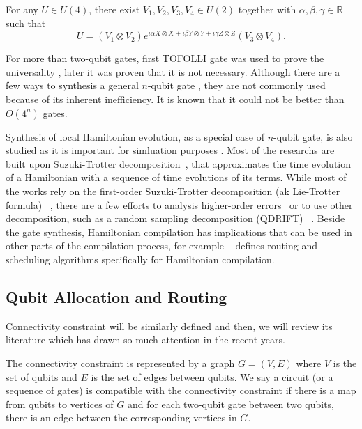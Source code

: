 \begin{lemma}\label{lem:kak_decomposition}
For any $U \in U(4)$, there exist $V_1, V_2, V_3, V_4 \in U(2)$ together with $\alpha, \beta, \gamma \in \mathbb{R}$ such that
\begin{equation}
  U = (V_1 \otimes V_2) e^{i\alpha X\otimes X + i\beta Y\otimes Y + i\gamma Z\otimes Z} (V_3 \otimes V_4).
  \end{equation}
\end{lemma}

For more than two-qubit gates, first TOFOLLI gate was used to prove the universality \cite{barenco1995}, later it was proven that it is not necessary. Although there are a few ways to synthesis a general $n$-qubit gate  \cite{sousa2006,shende2006}, they are not commonly used because of its inherent inefficiency. It is known that it could not be better than $O(4^n)$ gates. \cite{shende2006}

Synthesis of local Hamiltonian evolution, as a special case of $n$-qubit gate, is also studied as it is important for simluation purposes \cite{childs2018}. Most of the researchs are built upon Suzuki-Trotter decomposition~\cite{trotter1959, suzuki1991}, that approximates the time evolution of a Hamiltonian with a sequence of time evolutions of its terms. While most of the works rely on the first-order Suzuki-Trotter decomposition (ak Lie-Trotter formula) ~\cite{sivarajah2021, qiskit2023}, there are a few efforts to analysis higher-order errors~\cite{childs2021} or to use other decomposition, such as a random sampling decomposition (QDRIFT) ~\cite{campbell2019}. Beside the gate synthesis, Hamiltonian compilation has implications that can be used in other parts of the compilation process, for example ~\cite{lao2021} defines routing and scheduling algorithms specifically for Hamiltonian compilation.

\subsection{Qubit Allocation and Routing}

Connectivity constraint will be similarly defined and then, we will review its literature which has drawn so much attention in the recent years.

\begin{definition}
  The connectivity constraint is represented by a graph $G = (V, E)$ where $V$ is the set of qubits and $E$ is the set of edges between qubits. We say a circuit (or a sequence of gates) is compatible with the connectivity constraint if there is a map from qubits to vertices of $G$ and for each two-qubit gate between two qubits, there is an edge between the corresponding vertices in $G$.
\end{definition}


